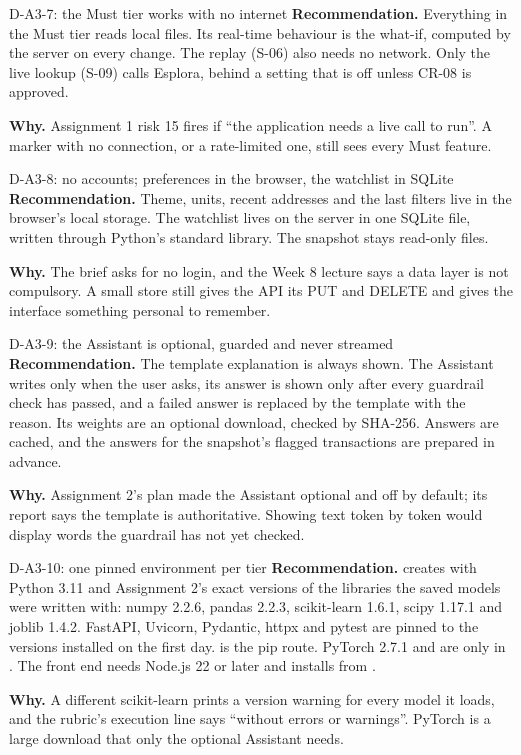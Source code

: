 \begin{decision}{D-A3-7: the Must tier works with no internet}
\textbf{Recommendation.} Everything in the Must tier reads local files. Its real-time behaviour
is the what-if, computed by the server on every change. The replay (S-06) also needs no network.
Only the live lookup (S-09) calls Esplora, behind a setting that is off unless CR-08 is approved.

\textbf{Why.} Assignment 1 risk 15 fires if ``the application needs a live call to run''. A marker
with no connection, or a rate-limited one, still sees every Must feature.
\end{decision}

\begin{decision}{D-A3-8: no accounts; preferences in the browser, the watchlist in SQLite}
\textbf{Recommendation.} Theme, units, recent addresses and the last filters live in the
browser's local storage. The watchlist lives on the server in one SQLite file, written through
Python's standard library. The snapshot stays read-only files.

\textbf{Why.} The brief asks for no login, and the Week 8 lecture says a data layer is not
compulsory. A small store still gives the API its PUT and DELETE and gives the interface something
personal to remember.
\end{decision}

\begin{decision}{D-A3-9: the Assistant is optional, guarded and never streamed}
\textbf{Recommendation.} The template explanation is always shown. The Assistant writes only when
the user asks, its answer is shown only after every guardrail check has passed, and a failed answer
is replaced by the template with the reason. Its weights are an optional download, checked by
SHA-256. Answers are cached, and the answers for the snapshot's flagged transactions are prepared in
advance.

\textbf{Why.} Assignment 2's plan made the Assistant optional and off by default; its report says
the template is authoritative. Showing text token by token would display words the guardrail has not
yet checked.
\end{decision}

\begin{decision}{D-A3-10: one pinned environment per tier}
\textbf{Recommendation.}  creates  with Python 3.11 and
Assignment 2's exact versions of the libraries the saved models were written with: numpy 2.2.6,
pandas 2.2.3, scikit-learn 1.6.1, scipy 1.17.1 and joblib 1.4.2. FastAPI, Uvicorn, Pydantic, httpx
and pytest are pinned to the versions installed on the first day.  is the
pip route. PyTorch 2.7.1 and  are only in . The
front end needs Node.js 22 or later and installs from .

\textbf{Why.} A different scikit-learn prints a version warning for every model it loads, and the
rubric's execution line says ``without errors or warnings''. PyTorch is a large download that only
the optional Assistant needs.
\end{decision}

